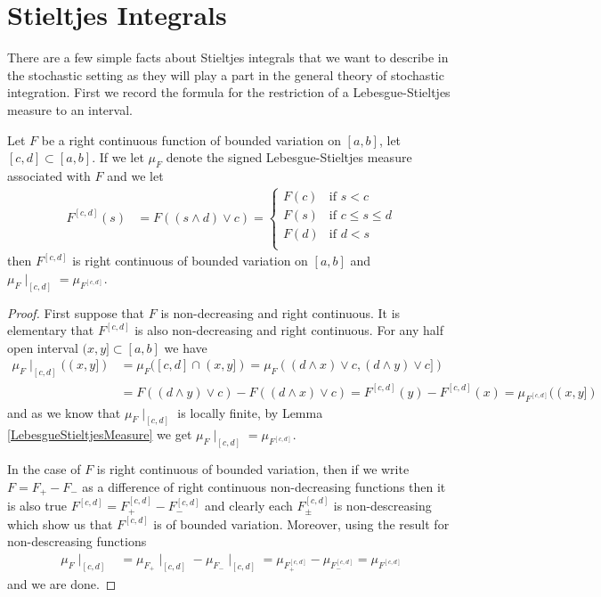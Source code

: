 \section{Stieltjes Integrals}

There are a few simple facts about Stieltjes integrals that we want to describe in the stochastic setting as they will play a part in the general theory of stochastic integration.  First we record the formula for the restriction of a Lebesgue-Stieltjes measure to an interval.
\begin{lem}\label{RestrictionOfLebesgueStieltjesMeasure}Let $F$ be a right continuous function of bounded variation on $[a,b]$, let $[c,d] \subset [a,b]$.  If we let $\mu_F$ denote the signed Lebesgue-Stieltjes measure associated with $F$ and we let
\begin{align*}
F^{[c,d]}(s) &=
F((s \wedge d) \vee c) = 
\begin{cases}
F(c) & \text{if $s < c$}\\
F(s) & \text{if $c \leq s \leq d$} \\
F(d) & \text{if $d < s$} \\
\end{cases}
\end{align*}
then $F^{[c,d]}$ is right continuous of bounded variation on $[a,b]$ and $\mu_F \mid_{[c,d]} = \mu_{F^{[c,d]}}$.  
\end{lem}
\begin{proof}
First suppose that $F$ is non-decreasing and right continuous.  It is elementary that $F^{[c,d]}$ is also non-decreasing and right continuous.  For any half open interval $(x,y] \subset [a,b]$ we have 
\begin{align*}
\mu_F\mid_{[c,d]}((x,y]) &= \mu_F ([c,d] \cap (x,y]) = \mu_F ((d \wedge x) \vee c, (d \wedge y) \vee c]) \\
&= F((d \wedge y) \vee c) - F((d \wedge x) \vee c) = F^{[c,d]}(y) - F^{[c,d]}(x) = \mu_{F^{[c,d]}}((x,y])
\end{align*}
and as we know that $\mu_F \mid_{[c,d]}$ is locally finite, by Lemma \ref{LebesgueStieltjesMeasure} we get $\mu_F\mid_{[c,d]} = \mu_{F^{[c,d]}}$.

In the case of $F$ is right continuous  of bounded variation, then if we write $F = F_+ - F_-$ as a difference of right continuous non-decreasing functions then it is also true $F^{[c,d]} = F^{[c,d]}_+ - F^{[c,d]}_-$ and clearly each $F^{[c,d]}_\pm$ is non-descreasing which show us that $F^{[c,d]}$ is of bounded variation.  Moreover, using the result for non-descreasing functions
\begin{align*}
\mu_F\mid_{[c,d]} &= \mu_{F_+}\mid_{[c,d]} - \mu_{F_-} \mid_{[c,d]} = \mu_{F^{[c,d]}_+} - \mu_{F^{[c,d]}_-} = \mu_{F^{[c,d]}}
\end{align*}
and we are done.
\end{proof}

